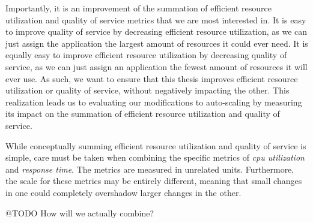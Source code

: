 Importantly, it is an improvement of the summation of efficient resource
utilization and quality of service metrics that we are most interested in. It is
easy to improve quality of service by decreasing efficient resource
utilization, as we can just assign the application the largest amount of
resources it could ever need. It is equally easy to improve efficient resource
utilization by decreasing quality of service, as we can just assign an
application the fewest amount of resources it will ever use. As such, we want to
ensure that this thesis improves efficient resource utilization or quality of
service, without negatively impacting the other. This realization leads us to
evaluating our modifications to auto-scaling by measuring its impact on the
summation of efficient resource utilization and quality of service.

While conceptually summing efficient resource utilization and quality of service
is simple, care must be taken when combining the specific metrics of \textit{cpu
utilization} and \textit{response time}. The metrics are measured in unrelated
units. Furthermore, the scale for these metrics may be entirely different,
meaning that small changes in one could completely overshadow larger changes in
the other.

@TODO How will we actually combine?
